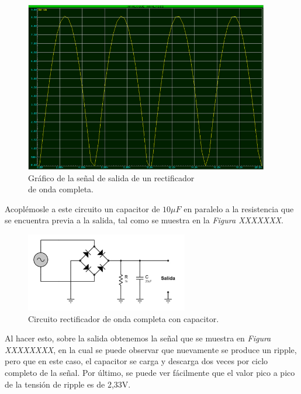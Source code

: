 \documentclass{article}
\begin{document}
\newpage
\begin{figure}[h]
	\centering
	\includegraphics[width=0.95\textwidth]{images/4-4-6-grafico-circuito-rectificador-onda-completa.jpg}
	\caption{Gráfico de la señal de salida de un rectificador\\ de onda completa.}
\end{figure}
\bigskip\bigskip


	Acoplémosle a este circuito un capacitor de $10\mu F$ en paralelo a la resistencia que se encuentra previa a la salida, tal como se muestra en la \textit{Figura XXXXXXX}.
\bigskip


\begin{figure}[h]
	\centering
	\includegraphics[width=0.633\textwidth]{images/4-4-7-circuito-rectificador-onda-completa-con-filtro.jpg}
	\medskip
	\caption{Circuito rectificador de onda completa con capacitor.}
\end{figure}
\bigskip\bigskip


Al hacer esto, sobre la salida obtenemos la señal que se muestra en \textit{Figura XXXXXXXX}, en la cual se puede observar que nuevamente se produce un ripple, pero que en este caso, el capacitor se carga y descarga dos veces por ciclo completo de la señal. Por último, se puede ver fácilmente que el valor pico a pico de la tensión de ripple es de 2,33V.
\end{document}
